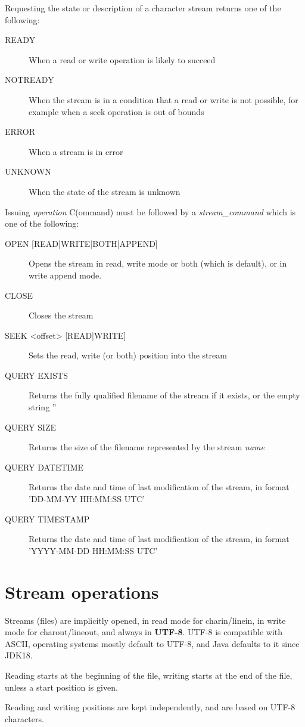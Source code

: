 Requesting the state or description of a character stream returns one of the following:
\begin{description}
  \item[READY] When a read or write operation is likely to succeed
  \item[NOTREADY] When the stream is in a condition that a read or write is not possible, for example when
  a seek operation is out of bounds
  \item[ERROR] When a stream is in error
  \item[UNKNOWN] When the state of the stream is unknown
\end{description}
Issuing \emph{operation} C(ommand) must be followed by a \emph{stream\_command} which is one of the following:
\begin{description}
  \item[OPEN [READ|WRITE|BOTH|APPEND{]}] Opens the stream in read, write mode or both (which is default), or in write append mode.
  \item[CLOSE] Closes the stream
  \item[SEEK <offset> [READ|WRITE{]}] Sets the read, write (or both) position into the stream
  \item[QUERY EXISTS] Returns the fully qualified filename of the stream if it exists, or the empty string ''
  \item[QUERY SIZE] Returns the size of the filename represented by the stream \emph{name}
  \item[QUERY DATETIME] Returns the date and time of last modification of the stream, in format 'DD-MM-YY HH:MM:SS UTC'
  \item[QUERY TIMESTAMP] Returns the date and time of last modification of the stream, in format 'YYYY-MM-DD HH:MM:SS UTC'
\end{description}

\section{Stream operations}
Streams (files) are implicitly opened, in read mode for charin/linein, in write mode for charout/lineout,
and always in \textbf{UTF-8}. UTF-8 is compatible with ASCII, operating systems mostly default to UTF-8,
and Java defaults to it since JDK18.

Reading starts at the beginning of the file, writing starts at the end of the file, unless a start position is given.

Reading and writing positions are kept independently, and are based on UTF-8 characters.

